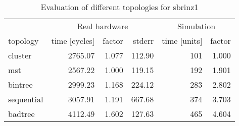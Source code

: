 \begin{table}[htb]
  \centering
  \begin{tabular}{lrrrrr}
  \toprule
  & \multicolumn{3}{c}{Real hardware} & \multicolumn{2}{c}{Simulation} \\
  topology & time [cycles] & factor & stderr & time [units] & factor \\
  \midrule
  cluster & 2765.07 & 1.077 & 112.90 & 101 & 1.000 \\
  mst & 2567.22 & 1.000 & 119.15 & 192 & 1.901 \\
  bintree & 2999.23 & 1.168 & 224.12 & 283 & 2.802 \\
  sequential & 3057.91 & 1.191 & 667.68 & 374 & 3.703 \\
  badtree & 4112.49 & 1.602 & 127.63 & 465 & 4.604 \\
  \midrule
  \end{tabular}
  \caption{Evaluation of different topologies for sbrinz1}
  \label{tab:sbrinz1}
\end{table}
